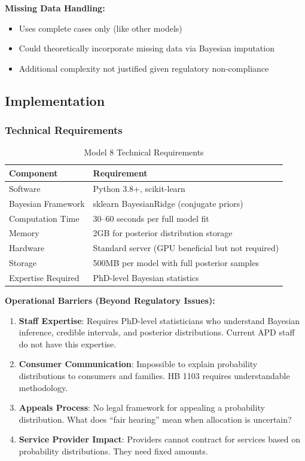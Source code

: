 \textbf{Missing Data Handling:}
\begin{itemize}
    \item Uses complete cases only (like other models)
    \item Could theoretically incorporate missing data via Bayesian imputation
    \item Additional complexity not justified given regulatory non-compliance
\end{itemize}

\subsection{Implementation}

\subsubsection{Technical Requirements}

\begin{table}[h]
\centering
\caption{Model 8 Technical Requirements}
\begin{tabular}{ll}
\toprule
\textbf{Component} & \textbf{Requirement} \\
\midrule
Software & Python 3.8+, scikit-learn \\
Bayesian Framework & sklearn BayesianRidge (conjugate priors) \\
Computation Time & 30--60 seconds per full model fit \\
Memory & 2GB for posterior distribution storage \\
Hardware & Standard server (GPU beneficial but not required) \\
Storage & 500MB per model with full posterior samples \\
Expertise Required & PhD-level Bayesian statistics \\
\bottomrule
\end{tabular}
\end{table}

\textbf{Operational Barriers (Beyond Regulatory Issues):}
\begin{enumerate}
    \item \textbf{Staff Expertise}: Requires PhD-level statisticians who understand Bayesian inference, credible intervals, and posterior distributions. Current APD staff do not have this expertise.
    
    \item \textbf{Consumer Communication}: Impossible to explain probability distributions to consumers and families. HB 1103 requires understandable methodology.
    
    \item \textbf{Appeals Process}: No legal framework for appealing a probability distribution. What does ``fair hearing'' mean when allocation is uncertain?
    
    \item \textbf{Service Provider Impact}: Providers cannot contract for services based on probability distributions. They need fixed amounts.
\end{enumerate}

